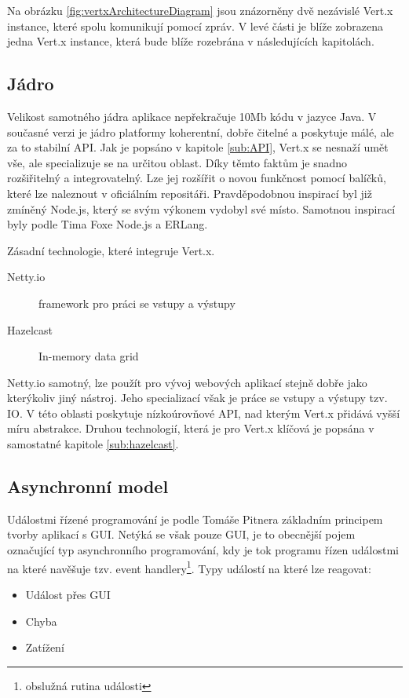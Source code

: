 Na obrázku \ref{fig:vertxArchitectureDiagram} jsou znázorněny dvě nezávislé Vert.x instance, které spolu komunikují pomocí zpráv. V levé části je blíže zobrazena jedna Vert.x instance, která bude blíže rozebrána v následujících kapitolách.

\subsection{Jádro}

Velikost samotného jádra aplikace nepřekračuje 10Mb kódu v jazyce Java. V současné verzi je jádro platformy koherentní, dobře čitelné a poskytuje málé, ale za to stabilní API. Jak je popsáno v kapitole \ref{sub:API}, Vert.x se nesnaží umět vše, ale specializuje se na určitou oblast. Díky těmto faktům je snadno rozšiřitelný a integrovatelný. Lze jej rozšířit o novou funkčnost pomocí balíčků, které lze naleznout v oficiálním repositáři. Pravděpodobnou inspirací byl již zmíněný Node.js, který se svým výkonem vydobyl své místo. Samotnou inspirací byly podle Tima Foxe Node.js a ERLang\cite{vertxNodejs}.

\noindent Zásadní technologie, které integruje Vert.x.
\begin{description}
\item[Netty.io] framework pro práci se vstupy a výstupy
\item[Hazelcast] In-memory data grid\cite{inMemoryDataGrid}
\end{description}

Netty.io samotný, lze použít pro vývoj webových aplikací stejně dobře jako kterýkoliv jiný nástroj. Jeho specializací však je práce se vstupy a výstupy tzv. IO. V této oblasti poskytuje nízkoúrovňové API, nad kterým Vert.x přidává vyšší míru abstrakce. Druhou technologií, která je pro Vert.x klíčová je popsána v samostatné kapitole \ref{sub:hazelcast}.

\subsection{Asynchronní model}

Událostmi řízené programování je podle Tomáše Pitnera\cite{javaProgramovani} základním principem tvorby aplikací s GUI. Netýká se však pouze GUI, je to obecnější pojem označující typ asynchronního programování, kdy je tok programu řízen událostmi na které navěšuje tzv. event handlery\footnote{obslužná rutina události}. Typy událostí na které lze reagovat:

\begin{itemize}
\item Událost přes GUI
\item Chyba
\item Zatížení
\end{itemize}

